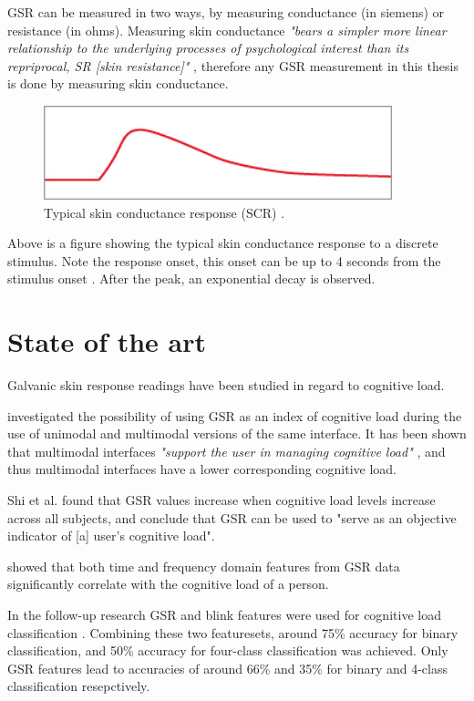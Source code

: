 \documentclass[11pt,leqno,a4paper]{report} %
\begin{document}
GSR can be measured in two ways, by measuring conductance (in siemens) or resistance (in ohms). Measuring skin conductance \textit{"bears a simpler more linear relationship to the underlying processes of psychological interest than its repriprocal, SR [skin resistance]"} \citep{lykken1971direct}, therefore any GSR measurement in this thesis is done by measuring skin conductance.

\begin{figure}[H]
  \centering   
    \includegraphics[width=0.9\textwidth]{gsr.jpg}
  \caption{Typical skin conductance response (SCR) \citep{dow_sc_explained_}.}
\end{figure}

Above is a figure showing the typical skin conductance response to a discrete stimulus. Note the response onset, this onset can be up to 4 seconds from the stimulus onset \citep{dow_sc_explained_}. After the peak, an exponential decay is observed.


\section{State of the art}
Galvanic skin response readings have been studied in regard to cognitive load.

\citet{Shi2007} investigated the possibility of using GSR as an index of cognitive load during the use of unimodal and multimodal versions of the same interface. It has been shown that multimodal interfaces \textit{"support the user in managing cognitive load"} \citep{Oviatt2004}, and thus multimodal interfaces have a lower corresponding cognitive load. 

Shi et al. found that GSR values increase when cognitive load levels increase across all subjects, and conclude that GSR can be used to "serve as an objective indicator of [a] user's cognitive load".

\citet{Nourbakhsh2012} showed that both time and frequency domain features from GSR data significantly correlate with the cognitive load of a person.

In the follow-up research GSR and blink features were used for cognitive load classification \citep{Nourbakhsh2013}. Combining these two featuresets, around 75\% accuracy for binary classification, and 50\% accuracy for four-class classification was achieved. Only GSR features lead to accuracies of around 66\% and 35\% for binary and 4-class classification resepctively.
\end{document}
